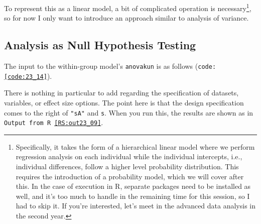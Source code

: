 \documentclass{ltjbook}
\begin{document}
To represent this as a linear model, a bit of complicated operation is necessary\footnote{Specifically, it takes the form of a hierarchical linear model where we perform regression analysis on each individual while the individual intercepts, i.e., individual differences, follow a higher level probability distribution. This requires the introduction of a probability model, which we will cover after this. In the case of execution in R, separate packages need to be installed as well, and it's too much to handle in the remaining time for this session, so I had to skip it. If you're interested, let's meet in the advanced data analysis in the second year.}, so for now I only want to introduce an approach similar to analysis of variance.
\subsection{Analysis as Null Hypothesis Testing}
The input to the within-group model's \texttt{anovakun} is as follows (\texttt{code:\ref{code:23_14}}).

There is nothing in particular to add regarding the specification of datasets, variables, or effect size options. The point here is that the design specification comes to the right of \texttt{"sA"} and \texttt{s}. When you run this, the results are shown as in \texttt{Output from R \ref{RS:out23_09}}.
\end{document}

